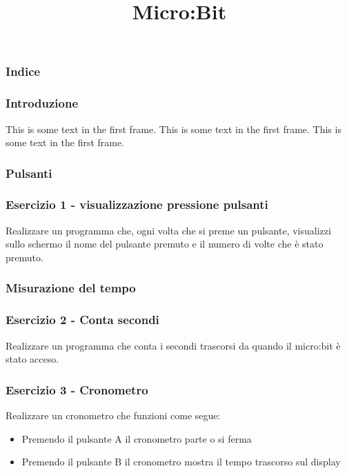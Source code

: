 \documentclass{beamer}
\title{Micro:Bit}
\begin{document}
\frame{\titlepage}
\begin{frame}
	\frametitle{Indice}
	\tableofcontents
\end{frame}
\begin{frame}
	\frametitle{Introduzione}
	This is some text in 
	the first frame. This is some text in the first frame. This is some text in the first frame.
\end{frame}

\begin{frame}
	\frametitle{Pulsanti}
	
\end{frame}

\begin{frame}
	\frametitle{Esercizio 1 - visualizzazione pressione pulsanti}
	Realizzare un programma che, ogni volta che si preme un pulsante, visualizzi sullo schermo il nome del pulsante premuto e il numero di volte che è stato premuto.\\
\end{frame}

\begin{frame}
	\frametitle{Misurazione del tempo}

\end{frame}

\begin{frame}
	\frametitle{Esercizio 2 - Conta secondi}
	Realizzare un programma che conta i secondi trascorsi da quando il micro:bit è stato acceso.\\
\end{frame}

\begin{frame}
	\frametitle{Esercizio 3 - Cronometro}
	Realizzare un cronometro che funzioni come segue:
	\begin{itemize}
		\item Premendo il pulsante A il cronometro parte o si ferma
		\item Premendo il pulsante B il cronometro mostra il tempo trascorso sul display
	\end{itemize}
\end{frame}
\end{document}
